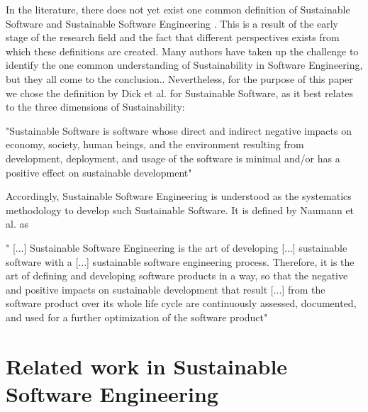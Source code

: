 In the literature, there does not yet exist one common definition of Sustainable Software and Sustainable Software Engineering %
. This is a result of the early stage of the research field and the fact that different perspectives exists from which these definitions are created. %
Many authors have taken up the challenge %
to identify the one common understanding of Sustainability in Software Engineering, but they all come to the conclusion.. %
 Nevertheless, for the purpose of this paper we %
chose the definition by Dick et al. \cite{dick_model_2010} %
for Sustainable Software, as it best relates to the three dimensions of Sustainability: %
\begin{citation}
	"Sustainable Software is software whose direct and indirect negative impacts on economy, society, human beings, and the environment resulting from development, deployment, and usage of the software is minimal and/or has a positive effect on sustainable development" \cite{dick_model_2010}
\end{citation}
Accordingly, Sustainable Software Engineering is understood as the systematics methodology to develop such Sustainable Software. It is defined by Naumann et al. as
\begin{citation}
" [...] Sustainable Software Engineering is the art of developing [...] sustainable software with a [...] sustainable software engineering process. Therefore, it is the art of defining and developing software products in a way, so that the negative and positive impacts on sustainable development that result [...] from the software product over its whole life cycle are continuously assessed, documented, and used for a further optimization of the software product" \cite{naumann_greensoft_2011} %
\end{citation}




\section{Related work in Sustainable Software Engineering} %


